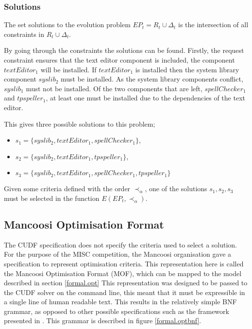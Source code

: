 \subsubsection{Solutions}
The set solutions to the evolution problem $EP_t = R_t \cup \Delta_t$ is the intersection of all constraints in $R_t \cup \Delta_t$.

By going through the constraints the solutions can be found.
Firstly, the request constraint ensures that the text editor component is included, the component $textEditor_1$ will be installed.
If $textEditor_1$ is installed then the system library component $syslib_2$ must be installed.
As the system library components conflict, $syslib_1$ must not be installed.
Of the two components that are left, $spellChecker_1$ and $tpspeller_1$, at least one must be installed due to the dependencies of the text editor.

This gives three possible solutions to this problem;
\begin{itemize}
  \item $s_1 = \{syslib_2, textEditor_1, spellChecker_1\}$,
  \item $s_2 = \{syslib_2, textEditor_1, tpspeller_1\}$,
  \item $s_3 = \{syslib_2, textEditor_1, spellChecker_1, tpspeller_1\}$
\end{itemize}

Given some criteria defined with the order $\prec_{\alpha}$, one of the solutions $s_1,s_2,s_3$ must be selected in the function $E(EP_t,\prec_{\alpha})$. 

\subsection{Mancoosi Optimisation Format}
\label{formal.mancoosioptimisationformat}
The CUDF specification does not specify the criteria used to select a solution.
For the purpose of the MISC competition, the Mancoosi organisation gave a specification to represent optimisation criteria.
This representation here is called the Mancoosi Optimisation Format (MOF), which can be mapped to the model described in section \ref{formal.opt}
This representation was designed to be passed to the CUDF solver on the command line, this meant that it must be expressible in a single line of human readable text.
This results in the relatively simple BNF grammar, as opposed to other possible specifications such as the framework presented in \citep{Treinen2009}. 
This grammar is described in figure \ref{formal.optbnf}.

